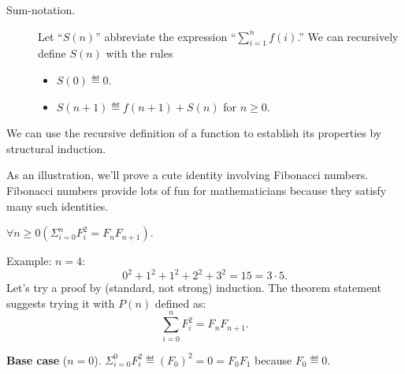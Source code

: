 \begin{definition}
\begin{description}

\item[Sum-notation.]  Let ``$S(n)$'' abbreviate the expression
``$\sum_{i=1}^n f(i)$.''  We can recursively define $S(n)$ with the rules
  \begin{itemize}
  \item $S(0) \eqdef 0$.
  \item $S(n+1) \eqdef  f(n+1) + S(n)$ for $n\geq 0$.
  \end{itemize}

\end{description}

\iffalse

\begin{optional}

We can use the recursive definition of a function to establish its
properties by structural induction.

As an illustration, we'll prove a cute identity involving Fibonacci
numbers.  Fibonacci numbers provide lots of fun for mathematicians because
they satisfy many such identities.
\begin{proposition}
  $\forall n \geq 0 (\Sigma_{i=0}^n F_i^2 = F_n F_{n+1})$.
\end{proposition}

Example: $n = 4$:
\[
0^2 + 1^2 + 1^2 + 2^2 + 3^2 = 15 = 3 \cdot 5.
\]
Let's try a proof by (standard, not strong) induction.  The theorem
statement suggests trying it with $P(n)$ defined as:
\[
\sum_{i=0}^n F_i^2 = F_n F_{n+1}.
\]

\textbf{Base case} ($n=0$). 
$\Sigma_{i=0}^0 F_i^2 \eqdef (F_0)^2 = 0 = F_0 F_1$ because
$F_0 \eqdef 0$.


\end{optional}
\end{definition}
